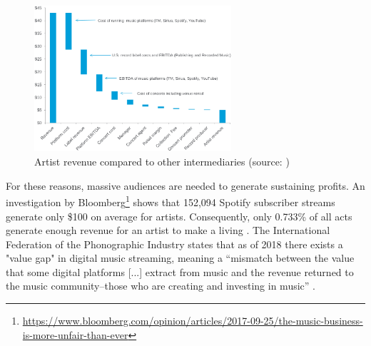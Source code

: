 
\begin{figure}
    \centering
    \includegraphics[width=0.65\textwidth]{problem-description/artist-revenue.png}
    \caption{Artist revenue compared to other intermediaries (source: \cite{bazinet2018putting})}
    \label{fig:artist-revenue}
\end{figure}

For these reasons, massive audiences are needed to generate sustaining profits. An investigation by Bloomberg\footnote{\url{https://www.bloomberg.com/opinion/articles/2017-09-25/the-music-business-is-more-unfair-than-ever}} shows that 152,094 Spotify subscriber streams generate only \$100 on average for artists. Consequently, only 0.733\% of all acts generate enough revenue for an artist to make a living \citep{ingham2018odds}. The International Federation of the Phonographic Industry states that as of 2018 there exists a "value gap" in digital music streaming, meaning a ``mismatch between the value that some digital platforms [...] extract from music and the revenue returned to the music community–those who are creating and investing in music'' \citep{ifpi2018global}.

